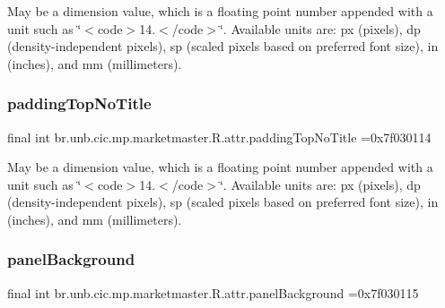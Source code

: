 May be a dimension value, which is a floating point number appended with a unit such as \char`\"{}$<$code$>$14.\+5sp$<$/code$>$\char`\"{}. Available units are\+: px (pixels), dp (density-\/independent pixels), sp (scaled pixels based on preferred font size), in (inches), and mm (millimeters). \mbox{\label{classbr_1_1unb_1_1cic_1_1mp_1_1marketmaster_1_1R_1_1attr_a4af37874ab78dabad5bbba073b2a1dda}} 
\subsubsection{\texorpdfstring{padding\+Top\+No\+Title}{paddingTopNoTitle}}
{\footnotesize\ttfamily final int br.\+unb.\+cic.\+mp.\+marketmaster.\+R.\+attr.\+padding\+Top\+No\+Title =0x7f030114\hspace{0.3cm}{\ttfamily [static]}}

May be a dimension value, which is a floating point number appended with a unit such as \char`\"{}$<$code$>$14.\+5sp$<$/code$>$\char`\"{}. Available units are\+: px (pixels), dp (density-\/independent pixels), sp (scaled pixels based on preferred font size), in (inches), and mm (millimeters). \mbox{\label{classbr_1_1unb_1_1cic_1_1mp_1_1marketmaster_1_1R_1_1attr_a3560c6938e8ff5b49b4679c669c78a1d}} 
\subsubsection{\texorpdfstring{panel\+Background}{panelBackground}}
{\footnotesize\ttfamily final int br.\+unb.\+cic.\+mp.\+marketmaster.\+R.\+attr.\+panel\+Background =0x7f030115\hspace{0.3cm}{\ttfamily [static]}}

